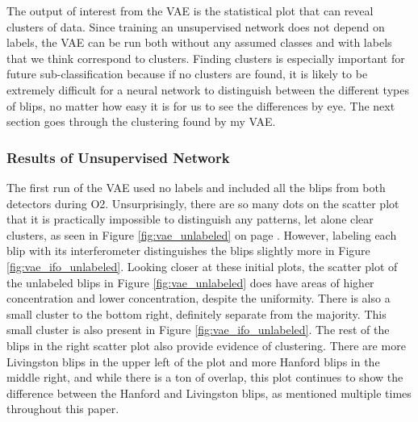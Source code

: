 \documentclass[a4paper]{article}
\begin{document}
The output of interest from the VAE is the statistical plot that can reveal clusters of data. Since training an unsupervised network does not depend on labels, the VAE can be run both without any assumed classes and with labels that we think correspond to clusters. Finding clusters is especially important for future sub-classification because if no clusters are found, it is likely to be extremely difficult for a neural network to distinguish between the different types of blips, no matter how easy it is for us to see the differences by eye. The next section goes through the clustering found by my VAE.

\subsubsection{Results of Unsupervised Network}

The first run of the VAE used no labels and included all the blips from both detectors during O2. Unsurprisingly, there are so many dots on the scatter plot that it is practically impossible to distinguish any patterns, let alone clear clusters, as seen in Figure \ref{fig:vae_unlabeled} on page \pageref{fig:unlabeled}. However, labeling each blip with its interferometer distinguishes the blips slightly more in Figure \ref{fig:vae_ifo_unlabeled}. Looking closer at these initial plots, the scatter plot of the unlabeled blips in Figure \ref{fig:vae_unlabeled} does have areas of higher concentration and lower concentration, despite the uniformity. There is also a small cluster to the bottom right, definitely separate from the majority. This small cluster is also present in Figure \ref{fig:vae_ifo_unlabeled}. The rest of the blips in the right scatter plot also provide evidence of clustering. There are more Livingston blips in the upper left of the plot and more Hanford blips in the middle right, and while there is a ton of overlap, this plot continues to show the difference between the Hanford and Livingston blips, as mentioned multiple times throughout this paper.
\end{document}
